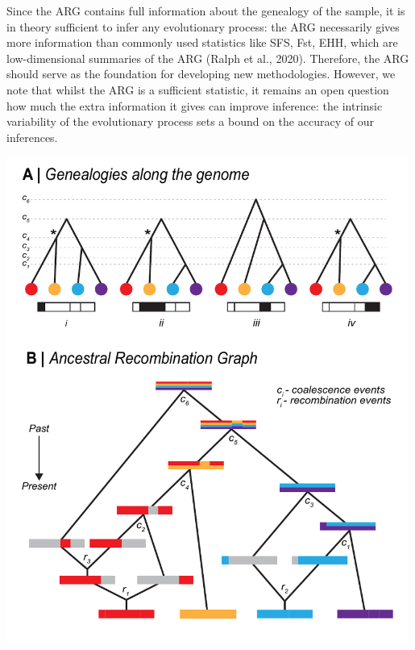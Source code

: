 \documentclass[twocolumn]{bmcart}%
\begin{document}
\begin{tcolorbox}[
  colback=blue!5!white,width=\columnwidth,colframe=blue!50!black,title= Box 1: Ancestral Recombination Graph (ARG)]
{Since the ARG contains full information about the genealogy of the sample, it is in theory sufficient to infer any evolutionary process: the ARG necessarily gives more information than commonly used statistics like SFS, Fst, EHH, which are low-dimensional summaries of the ARG (Ralph et al., 2020). Therefore, the ARG should serve as the foundation for developing new methodologies. However, we note that whilst the ARG is a sufficient statistic, it remains an open question how much the extra information it gives can improve inference: the intrinsic variability of the evolutionary process sets a bound on the accuracy of our inferences.}
\begin{center}
    \includegraphics[width=0.99\textwidth]{Fig_B1.pdf}\end{center}
\end{tcolorbox}
\end{document}
